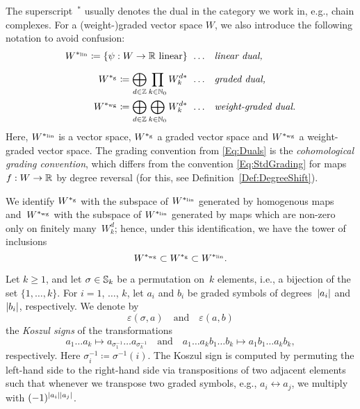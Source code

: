 \documentclass[\MainFolder/Text.tex]{subfiles}
\begin{document}
\begin{Definition}
The superscript $\,{}^*$ usually denotes the dual in the category we work in, e.g., chain complexes. For a (weight-)graded vector space $W$, we also introduce the following notation to avoid confusion:%
\begin{equation}\label{Eq:Duals}\begin{aligned}
W^{*_{\mathrm{lin}}} \coloneqq \{\psi: W \rightarrow \mathbb{R} \text{ linear}\} &\;\,\dots&& \text{\emph{linear dual,}}\\[2\jot]
W^{*_{\mathrm{g}}}  \coloneqq \bigoplus_{d\in  \mathbb{Z}} \prod_{k\in \mathbb{N}_0} W_{k}^{d*} &\;\,\dots&& \text{\emph{graded dual,}}\\
W^{*_{\mathrm{wg}}} \coloneqq \bigoplus_{d\in \mathbb{Z}} \bigoplus_{k\in \mathbb{N}_0} W_k^{d*} &\;\,\dots&& \text{\emph{weight-graded dual.}}
\end{aligned}
\end{equation}
Here, $W^{*_{\mathrm{lin}}}$ is a vector space, $W^{*_{\mathrm{g}}}$ a graded vector space and $W^{*_{\mathrm{wg}}}$ a weight-graded vector space. The grading convention from \eqref{Eq:Duals} is the \emph{cohomological grading convention}, which differs from the convention \eqref{Eq:StdGrading} for maps $f: W \rightarrow \mathbb{R}$ by degree reversal (for this, see Definition~\ref{Def:DegreeShift}).

We identify $W^{*_{\mathrm{g}}}$ with the subspace of $W^{*_{\mathrm{lin}}}$ generated by homogenous maps and~$W^{*_{\mathrm{wg}}}$ with the subspace of $W^{*_{\mathrm{lin}}}$ generated by maps which are non-zero only on finitely many~$W_k^d$; hence, under this identification, we have the tower of inclusions 
$$ W^{*_{\mathrm{wg}}} \subset W^{*_{\mathrm{g}}} \subset W^{*_{\mathrm{lin}}}.$$
\end{Definition}


\begin{Definition} \label{Def:Koszul}
Let $k\ge 1$, and let $\sigma\in \mathbb{S}_k$ be a permutation on~$k$ elements, i.e., a bijection of the set $\{1,\dotsc,k\}$. For $i=1$, $\dotsc$, $k$,  let $a_i$ and $b_i$ be graded symbols of degrees~$|a_i|$ and~$|b_i|$, respectively. We denote by 
$$\varepsilon(\sigma,a) \quad\text{and}\quad\varepsilon(a,b)$$
the \emph{Koszul signs} of the transformations
 $$ a_1 \dots a_k \longmapsto a_{\sigma_1^{-1}} \dots a_{\sigma_k^{-1}} \quad \text{and} \quad a_1 \dots a_k b_1 \dots b_k \longmapsto a_1 b_1 \dots a_k b_k, $$
respectively. Here $\sigma_i^{-1} \coloneqq \sigma^{-1}(i)$. The Koszul sign is computed by permuting the left-hand side to the right-hand side via transpositions of two adjacent elements such that whenever we transpose two graded symbols, e.g., $a_i \longleftrightarrow a_{j}$, we multiply with $(-1)^{|a_i||a_{j}|}$.
\end{Definition}
\end{document}
